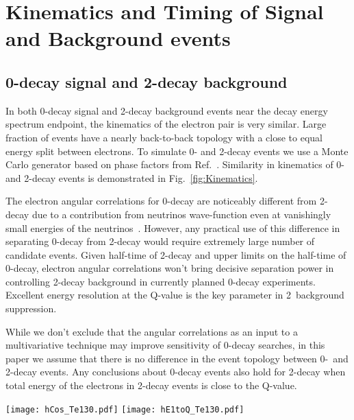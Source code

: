 \section{Kinematics and Timing of Signal and Background events}


\subsection{0\nbb-decay signal and 2\nbb-decay background}

In both 0\nbb-decay signal and 2\nbb-decay background events near the decay energy spectrum endpoint, the kinematics of the
electron pair is very similar. Large fraction of events have a nearly back-to-back topology with a close to 
equal energy split between electrons. To simulate 0\nbb- and 2\nbb-decay events we use a Monte Carlo generator based on phase 
factors from Ref.~\cite{Jenni}. Similarity in kinematics of 0\nbb- and 2\nbb-decay events is demonstrated in Fig.~\ref{fig:Kinematics}.

The electron angular correlations for 0\nbb-decay are noticeably different from 2\nbb-decay due to a contribution from
neutrinos wave-function even at vanishingly small energies of the neutrinos~\cite{Jenni}. However, any practical use of this difference 
in separating 0\nbb-decay from 2\nbb-decay would require extremely large number of candidate events. Given half-time of 2\nbb-decay 
and upper limits on the half-time of 0\nbb-decay, electron angular correlations won't bring decisive separation power in controlling 
2\nbb-decay background in currently planned 0\nbb-decay experiments. Excellent energy resolution at the Q-value is the key parameter
in 2\nbb~background suppression.

While we don't exclude that the angular correlations as an input to a multivariative technique may improve sensitivity of 0\nbb-decay 
searches, in this paper we assume that there is no difference in the event topology between 0\nbb-~and 2\nbb-decay events. Any conclusions 
about 0\nbb-decay events also hold for 2\nbb-decay when total energy of the electrons in 2\nbb-decay events is close to the Q-value.


\begin{figure*}[ht]
  \centering
  \texttt{[image: hCos\_Te130.pdf]}
  \texttt{[image: hE1toQ\_Te130.pdf]}
  \caption{Comparison between kinematics of 0{\nbb} (\emph{dashed red
      lines}) and 2{\nbb} decays (\emph{solid black lines}) for events
    with the total kinetic energy of the electrons above 90\% of the
    Q-value. \emph{Left:} Cosine of the angle between two
    electrons. \emph{Right:} Fraction of energy carried by one of the
    two electrons. Vertical bars at each bin of the histograms indicate
    statistical uncertainty for that bin.}
  \label{fig:Kinematics}
\end{figure*}


